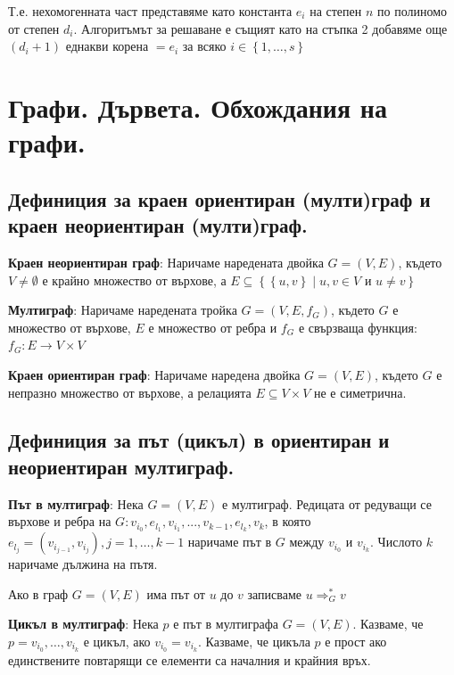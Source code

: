 \documentclass{article}
\renewcommand{\\}{\newline}
\newcommand{\sep}{\;|\;}
\begin{document}
            Т.е. нехомогенната част представяме като константа \(e_i\) на степен \(n\)  по полиномо от степен \(d_{i}\). Алгоритъмът за решаване е същият като на стъпка 2 добавяме още \((d_{i} + 1)\)  еднакви корена \(=e_{i}\) за всяко \(i \in \left\{1,\dots, s\right\}\)   

\newpage
\section{Графи. Дървета. Обхождания на графи.}
  \subsection{Дефиниция за краен ориентиран (мулти)граф и краен неориентиран (мулти)граф.}
  \textbf{Краен неориентиран граф}: Наричаме наредената двойка \(G = (V, E)\), където \(V \not= \emptyset\) е крайно множество от върхове, а \(E \subseteq \left\{\left\{u, v\right\} \sep u, v \in V \text{ и } u \not= v\right\}\)    

      \textbf{Мултиграф}: Наричаме наредената тройка \(G = (V, E, f_{G})\), където \(G\) е множество от върхове, \(E\) е множество от ребра и \(f_{G}\) е свързваща функция: \(f_{G}: E \to V \times V\)   

      \textbf{Краен ориентиран граф}: Наричаме наредена двойка \(G = (V, E)\), където \(G\) е непразно множество от върхове, а релацията \(E \subseteq V \times V\) не е симетрична.
    
      \subsection{Дефиниция за път (цикъл) в ориентиран и неориентиран мултиграф.} 
      \textbf{Път в мултиграф}: Нека \(G = (V, E)\) е мултиграф. Редицата от редуващи се върхове и ребра на \(G: v_{i_0}, e_{l_1}, v_{i_1}, ..., v_{k-1}, e_{l_k}, v_{k}\), в която \(e_{l_j} = (v_{i_{j-1}}, v_{i_j}), j = 1,\dots,k-1\) наричаме път в \(G\) между \(v_{i_0}\) и  \(v_{i_k}\). Числото \(k\) наричаме дължина на пътя.       

      Ако в граф \(G = (V, E)\)  има път от \(u\) до \(v\) записваме \(u \Rightarrow_{G}^{*} v\)    
      
      \textbf{Цикъл в мултиграф}: Нека \(p\) е път в мултиграфа \(G = (V, E)\). Казваме, че \(p = v_{i_0},\dots, v_{i_k}\) е цикъл, ако \(v_{i_0} = v_{i_k}\). Казваме, че цикъла \(p\) е прост ако единствените повтарящи се елементи са началния и крайния връх.     
\end{document}
